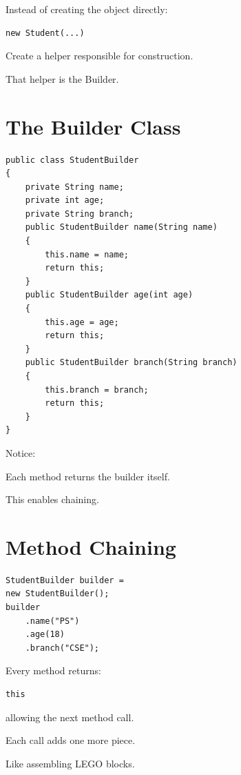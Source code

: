 \documentclass[11pt,a4paper]{book}
\begin{document}
Instead of creating the object directly:

\begin{verbatim}
new Student(...)
\end{verbatim}

Create a helper responsible for construction.

That helper is the Builder.


\section{The Builder Class}

\begin{verbatim}
public class StudentBuilder
{
    private String name;
    private int age;
    private String branch;
    public StudentBuilder name(String name)
    {
        this.name = name;
        return this;
    }
    public StudentBuilder age(int age)
    {
        this.age = age;
        return this;
    }
    public StudentBuilder branch(String branch)
    {
        this.branch = branch;
        return this;
    }
}
\end{verbatim}

Notice:

Each method returns the builder itself.

This enables chaining.


\section{Method Chaining}

\begin{verbatim}
StudentBuilder builder =
new StudentBuilder();
builder
    .name("PS")
    .age(18)
    .branch("CSE");
\end{verbatim}

Every method returns:

\begin{verbatim}
this
\end{verbatim}

allowing the next method call.

\begin{mentalmodel}

Each call adds one more piece.

Like assembling LEGO blocks.

\end{mentalmodel}
\end{document}
